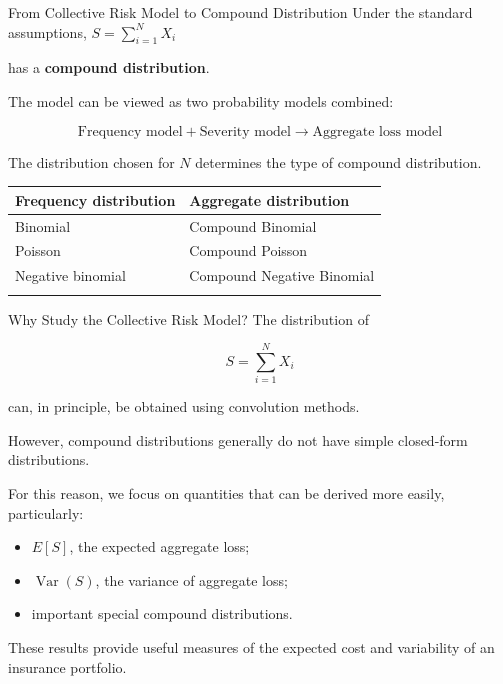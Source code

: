 \documentclass[
  ignorenonframetext,
  aspectratio=169,
]{beamer}
\newcounter{none} %
\providecommand{\tightlist}{%
  \setlength{\itemsep}{0pt}\setlength{\parskip}{0pt}}
\begin{document}
\begin{frame}{From Collective Risk Model to Compound Distribution}
\protect{}\label{from-collective-risk-model-to-compound-distribution}
Under the standard assumptions, \(S=\sum_{i=1}^{N}X_i\)

has a \textbf{compound distribution}.

The model can be viewed as two probability models combined:

\[
\boxed{
\text{Frequency model}
+
\text{Severity model}
\longrightarrow
\text{Aggregate loss model}
}
\]

The distribution chosen for \(N\) determines the type of compound
distribution.

{\def\LTcaptype{none} %
\begin{longtable}[]{@{}ll@{}}
\toprule\noalign{}
Frequency distribution & Aggregate distribution \\
\midrule\noalign{}
\endhead
Binomial & Compound Binomial \\
Poisson & Compound Poisson \\
Negative binomial & Compound Negative Binomial \\
\bottomrule\noalign{}
\end{longtable}
}
\end{frame}

\begin{frame}{Why Study the Collective Risk Model?}
\protect{}\label{why-study-the-collective-risk-model}
The distribution of

\[
S=\sum_{i=1}^{N}X_i
\]

can, in principle, be obtained using convolution methods.

However, compound distributions generally do not have simple closed-form
distributions.

For this reason, we focus on quantities that can be derived more easily,
particularly:

\begin{itemize}
\tightlist
\item
  \(E[S]\), the expected aggregate loss;
\item
  \(\operatorname{Var}(S)\), the variance of aggregate loss;
\item
  important special compound distributions.
\end{itemize}

These results provide useful measures of the expected cost and
variability of an insurance portfolio.
\end{frame}
\end{document}
